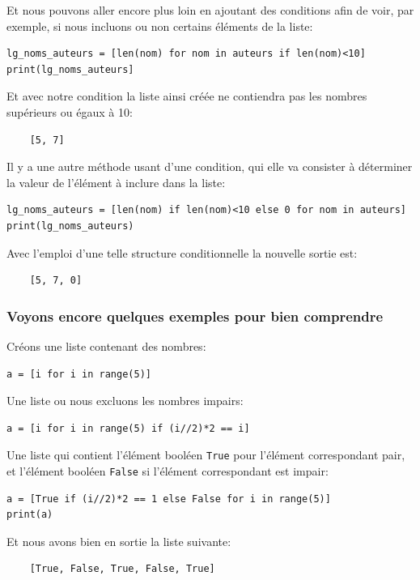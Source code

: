\documentclass[a4paper,11pt]{book}
\begin{document}
Et nous pouvons aller encore plus loin en ajoutant des conditions afin de voir, par exemple, si nous incluons ou non certains éléments de la liste:
\begin{lstlisting}
lg_noms_auteurs = [len(nom) for nom in auteurs if len(nom)<10]
print(lg_noms_auteurs]
\end{lstlisting}
\medskip

Et avec notre condition la liste ainsi créée ne contiendra pas les nombres supérieurs ou égaux à 10:
\begin{verbatim}
    [5, 7]
\end{verbatim}
\medskip

Il y a une autre méthode usant d'une condition, qui elle va consister à déterminer la valeur de l'élément à inclure dans la liste:
\begin{lstlisting}
lg_noms_auteurs = [len(nom) if len(nom)<10 else 0 for nom in auteurs]
print(lg_noms_auteurs)
\end{lstlisting}
\medskip

Avec l'emploi d'une telle structure conditionnelle la nouvelle sortie est:
\begin{verbatim}
    [5, 7, 0]
\end{verbatim}
\medskip

\subsubsection*{Voyons encore quelques exemples pour bien comprendre}
Créons une liste contenant des nombres:
\begin{lstlisting}
a = [i for i in range(5)]
\end{lstlisting}
\medskip

Une liste ou nous excluons les nombres impairs:
\begin{lstlisting}
a = [i for i in range(5) if (i//2)*2 == i]
\end{lstlisting}
\medskip

Une liste qui contient l'élément booléen \texttt{True} pour l'élément correspondant pair, et l'élément booléen \texttt{False} si l'élément correspondant est impair:
\begin{lstlisting}
a = [True if (i//2)*2 == 1 else False for i in range(5)]
print(a)
\end{lstlisting}
\medskip

Et nous avons bien en sortie la liste suivante:
\begin{verbatim}
    [True, False, True, False, True]
\end{verbatim}
\medskip
\end{document}
